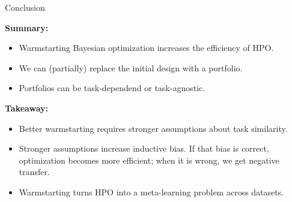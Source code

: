 \documentclass[main]{subfiles}
\begin{document}
\begin{frame}{Conclusion}

\textbf{Summary:}
\begin{itemize}
    \item Warmstarting Bayesian optimization increases the efficiency of HPO.
    \item We can (partially) replace the initial design with a portfolio.
    \item Portfolios can be task-dependend or task-agnostic.
\end{itemize}

\textbf{Takeaway:}
\begin{itemize}
    \item Better warmstarting requires stronger assumptions about task similarity. 
    \item Stronger assumptions increase inductive bias. If that bias is correct, optimization becomes more efficient; when it is wrong, we get negative transfer.
    \item Warmstarting turns HPO into a meta-learning problem across datasets.
\end{itemize}

\end{frame}
\end{document}
